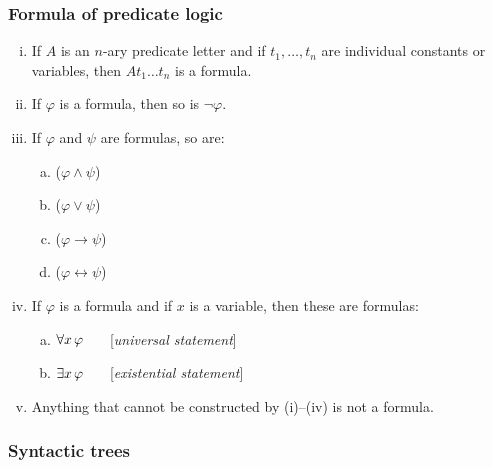 \documentclass[fleqn,10pt,serif,xcolor=svgnames,xcolor=table,aspectratio=169,handout]{beamer}
\begin{document}
\begin{frame}
  \frametitle{Formula of predicate logic}

  \begin{enumerate}[(i)]
    \item If $A$ is an $n$-ary predicate letter and if $t_1, \dots, t_n$ are individual constants     or variables, then $At_1 \dots t_n$ is a formula.
    \item If $\varphi$ is a formula, then so is $\neg \varphi$.
    \item If $\varphi$ and $\psi$ are formulas, so are:
    \vspace*{-0.4cm}
    \begin{multicols}{4}
      \begin{enumerate}[a.]
        \item ($\varphi \wedge \psi$)
        \item ($\varphi \vee \psi$)
        \item ($\varphi \rightarrow \psi$)
        \item ($\varphi \leftrightarrow \psi$)
      \end{enumerate}
    \end{multicols}
    \vspace*{-0.4cm}
    \item If $\varphi$ is a formula and if $x$ is a variable, then these are formulas:
    \vspace*{-0.4cm}
    \begin{multicols}{2}
      \begin{enumerate}[a.]
        \item $\forall x \thinspace \varphi$ \ \ \ [\textit{universal statement}]
        \item $\exists x \thinspace \varphi$ \ \ \ [\textit{existential statement}]
      \end{enumerate}
    \end{multicols}
    \vspace*{-0.4cm}
    \item Anything that cannot be constructed by (i)--(iv) is not a formula.
  \end{enumerate}

\end{frame}


\begin{frame}
  \frametitle{Syntactic trees}

  \begin{center}
    \quad \quad \quad \quad \quad \quad
  \end{center}

\end{frame}
\end{document}
